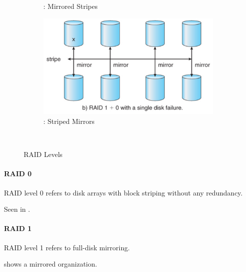 \begin{figure}[h!tbp]
\begin{subfigure}{0.45\linewidth}
    \caption{: Mirrored Stripes}
    \label{subfig:RAID_01}
  \end{subfigure}
  \begin{subfigure}{0.45\linewidth}
    \centering
    \includegraphics[scale=1.00]{./Drawings/EDAF35-Operating_Systems/RAID_10.png}
    \caption{: Striped Mirrors}
    \label{subfig:RAID_10}
  \end{subfigure} \\
  \caption{RAID Levels}
  \label{fig:RAID_Levels}
\end{figure}

\paragraph{RAID 0}\label{par:RAID_0}
RAID level 0 refers to disk arrays with block striping without any redundancy.

Seen in .

\paragraph{RAID 1}\label{par:RAID_1}
RAID level 1 refers to full-disk mirroring.

 shows a mirrored organization.


